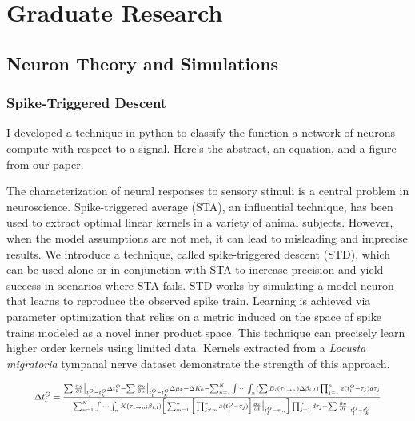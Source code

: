 \documentclass[../r.tex]{subfiles}
\begin{document}
\section{Graduate Research}

\subsection{Neuron Theory and Simulations}

\subsubsection{Spike-Triggered Descent}
I developed a technique in python to classify the function a network of neurons compute with respect to a signal.  Here's the abstract, an equation, and a figure from our \href{https://arxiv.org/pdf/2005.05572.pdf}{paper}.

The characterization of neural responses to sensory stimuli is a central problem
in neuroscience. Spike-triggered average (STA), an influential technique, has been
used to extract optimal linear kernels in a variety of animal subjects. However,
when the model assumptions are not met, it can lead to misleading and imprecise
results. We introduce a technique, called spike-triggered descent (STD), which can
be used alone or in conjunction with STA to increase precision and yield success
in scenarios where STA fails. STD works by simulating a model neuron that learns
to reproduce the observed spike train. Learning is achieved via parameter optimization that relies on a metric induced on the space of spike trains modeled as a
novel inner product space. This technique can precisely learn higher order kernels
using limited data. Kernels extracted from a \textit{Locusta migratoria} tympanal nerve
dataset demonstrate the strength of this approach.

\begin{equation} \label{eq:GCSRMdt}
\resizebox{.9\hsize}{!}{$
\Delta t_l^O = 
\frac{
\sum \frac{\partial \eta}{\partial t} \big|_{t_l^O - t_k^O}  \Delta t_k^O
-
\sum \frac{\partial \eta}{\partial \mu} \big|_{t_l^O - t_k^O} \Delta \mu_k
-
\Delta K_0
- 
\sum_{n=1}^N  \idotsint_n
(\sum B_i(\tau_{1 \rightarrow n}) \Delta \beta_{i,l})
\prod_{j = 1}^n
x(t_l^O - \tau_j)
d\tau_j
}
{
\sum_{n=1}^N  \idotsint_n
K(\tau_{1 \rightarrow n}; \beta_{i,l})
\Big[
\sum_{m=1}^n
\Big[ 
\prod_{j \ne m}^n
x(t_l^O - \tau_j)
\Big]
\frac{\partial x}{\partial t} \big|_{t_l^O - \tau_m} 
\Big]
\prod_{j = 1}^n
d\tau_j
+ \sum \frac{\partial \eta}{\partial t} \big|_{t_l^O - t_k^O}
}
$}
\end{equation}
\end{document}
